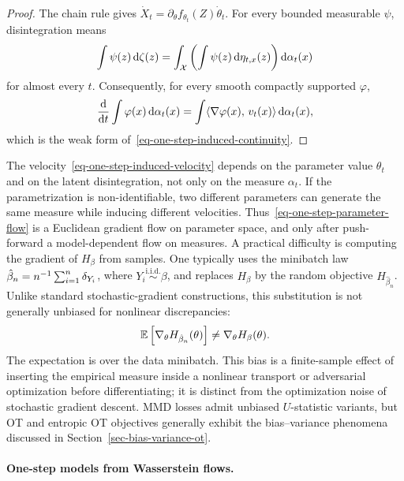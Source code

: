 \begin{proof}
	The chain rule gives $\dot X_t=\partial_\theta f_{\theta_t}(Z)\dot\theta_t$. For every bounded measurable $\psi$, disintegration means
	\[
		\int \psi(z)\,\mathrm{d}\zeta(z)=\int_{\mathcal{X}}\left(\int \psi(z)\,\mathrm{d}\eta_{t,x}(z)\right)\mathrm{d}\alpha_t(x)
	\]
	for almost every $t$. Consequently, for every smooth compactly supported $\varphi$,
	\[
		\frac{\mathrm{d}}{\mathrm{d} t}\int \varphi(x)\,\mathrm{d}\alpha_t(x)
		=
		\int \langle \nabla\varphi(x),\,v_t(x)\rangle\,\mathrm{d}\alpha_t(x),
	\]
	which is the weak form of~\eqref{eq-one-step-induced-continuity}.
\end{proof}

The velocity~\eqref{eq-one-step-induced-velocity} depends on the parameter value $\theta_t$ and on the latent disintegration, not only on the measure $\alpha_t$. If the parametrization is non-identifiable, two different parameters can generate the same measure while inducing different velocities. Thus~\eqref{eq-one-step-parameter-flow} is a Euclidean gradient flow on parameter space, and only after push-forward a model-dependent flow on measures.
A practical difficulty is computing the gradient of $H_\beta$ from samples. One typically uses the minibatch law $\hat\beta_n=n^{-1}\sum_{i=1}^n\delta_{Y_i}$, where $Y_i\overset{\mathrm{i.i.d.}}{\sim}\beta$, and replaces $H_\beta$ by the random objective $H_{\hat\beta_n}$. Unlike standard stochastic-gradient constructions, this substitution is not generally unbiased for nonlinear discrepancies:
\[
	\mathbb{E}\left[\nabla_\theta H_{\hat\beta_n}(\theta)\right]
	\neq
	\nabla_\theta H_\beta(\theta).
\]
The expectation is over the data minibatch. This bias is a finite-sample effect of inserting the empirical measure inside a nonlinear transport or adversarial optimization before differentiating; it is distinct from the optimization noise of stochastic gradient descent. MMD losses admit unbiased $U$-statistic variants, but OT and entropic OT objectives generally exhibit the bias--variance phenomena discussed in Section~\ref{sec-bias-variance-ot}.

\paragraph{One-step models from Wasserstein flows.}

